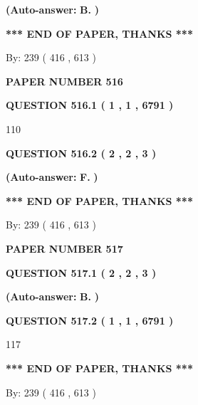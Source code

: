 \documentclass{ctexart}
\begin{document}
 
{\textbf{(Auto-answer:}}
{\textbf{\large{
B.}}}
{\textbf{)}}
 
 
   
   
   
   
\vspace{1.0in} 
{\textbf{\large{ *** END OF PAPER, THANKS *** }}} 
   
   
\hspace{1.0in} By: 
 239 ( 416 ,  613 )
   
   
   
   
\newpage 
\setcounter{page}{ 
   516001 } 
   
   
 {\textbf{ \Large{ PAPER NUMBER  516  }}}
   
   
   
   
  
  
{\textbf{\large{QUESTION
516.1 
 ( 1 , 1 , 6791 )
}}}

110
  
  
{\textbf{\large{QUESTION
516.2 
 ( 2 , 2 , 3 )
}}}
 
 
{\textbf{(Auto-answer:}}
{\textbf{\large{
F.}}}
{\textbf{)}}
 
 
   
   
   
   
\vspace{1.0in} 
{\textbf{\large{ *** END OF PAPER, THANKS *** }}} 
   
   
\hspace{1.0in} By: 
 239 ( 416 ,  613 )
   
   
   
   
\newpage 
\setcounter{page}{ 
   517001 } 
   
   
 {\textbf{ \Large{ PAPER NUMBER  517  }}}
   
   
   
   
  
  
{\textbf{\large{QUESTION
517.1 
 ( 2 , 2 , 3 )
}}}
 
 
{\textbf{(Auto-answer:}}
{\textbf{\large{
B.}}}
{\textbf{)}}
 
 
  
  
{\textbf{\large{QUESTION
517.2 
 ( 1 , 1 , 6791 )
}}}

117
   
   
   
   
\vspace{1.0in} 
{\textbf{\large{ *** END OF PAPER, THANKS *** }}} 
   
   
\hspace{1.0in} By: 
 239 ( 416 ,  613 )
   
   
   
\end{document}

